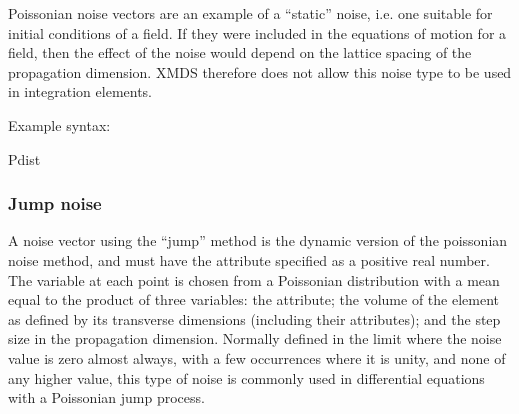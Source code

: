 \documentclass[letterpaper,10pt,english]{sphinxmanual}
\begin{document}
\sphinxAtStartPar
Poissonian noise vectors are an example of a “static” noise, i.e. one suitable for initial conditions of a field.  If they were included in the equations of motion for a field, then the effect of the noise would depend on the lattice spacing of the propagation dimension.  XMDS therefore does not allow this noise type to be used in integration elements.

\sphinxAtStartPar
Example syntax:

\begin{sphinxVerbatim}[commandchars=\\\{\}]
 
           
      Pdist
\end{sphinxVerbatim}

\ignorespaces 

\subsubsection{Jump noise}
\label{\detokenize{reference_elements:jump-noise}}\label{\detokenize{reference_elements:jumpnoise}}\label{\detokenize{reference_elements:index-63}}
\sphinxAtStartPar
A noise vector using the “jump” method is the dynamic version of the poissonian noise method, and must have the  attribute specified as a positive real number.  The variable at each point is chosen from a Poissonian distribution with a mean equal to the product of three variables: the  attribute; the volume of the element as defined by its transverse dimensions (including their  attributes); and the step size in the propagation dimension.  Normally defined in the limit where the noise value is zero almost always, with a few occurrences where it is unity, and none of any higher value, this type of noise is commonly used in differential equations with a Poissonian jump process.
\end{document}
